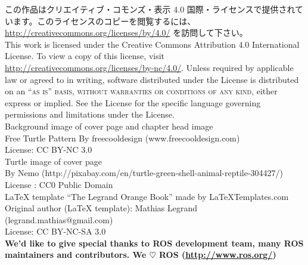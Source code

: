 \documentclass[11pt,fleqn]{book} %
\begin{document}
\noindent この作品はクリエイティブ・コモンズ・表示 4.0 国際・ライセンスで提供されています。このライセンスのコピーを閲覧するには、 \url{http://creativecommons.org/licenses/by/4.0/} を訪問して下さい。\\

\noindent This work is licensed under the Creative Commons Attribution 4.0 International License. To view a copy of this license, visit \url{http://creativecommons.org/licenses/by-nc/4.0/}. Unless required by applicable law or agreed to in writing, software distributed under the License is distributed on an \textsc{``as is'' basis, without warranties or conditions of any kind}, either express or implied. See the License for the specific language governing permissions and limitations under the License.\\ %


\noindent Background image of cover page and chapter head image\\
Free Turtle Pattern By freecooldesign (www.freecooldesign.com)\\
License: CC BY-NC 3.0\\

\noindent Turtle image of cover page\\
By Nemo (http://pixabay.com/en/turtle-green-shell-animal-reptile-304427/)\\
License : CC0 Public Domain\\

\noindent LaTeX template ``The Legrand Orange Book'' made by LaTeXTemplates.com\\
Original author (LaTeX template): Mathias Legrand (legrand.mathias@gmail.com)\\
License: CC BY-NC-SA 3.0\\

\noindent \textbf{We'd like to give special thanks to ROS development team, many ROS maintainers and contributors. We $\heartsuit$ ROS (\url{http://www.ros.org/})}

\end{document}
